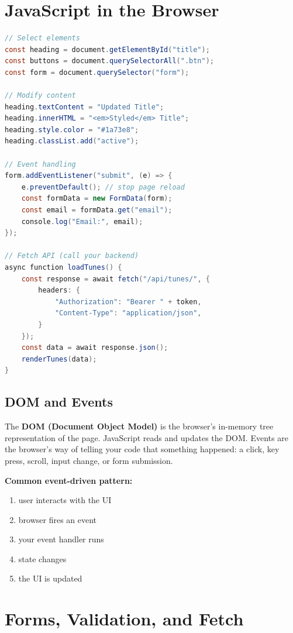 \documentclass[12pt, a4paper, oneside]{book}
\begin{document}
\section{JavaScript in the Browser}

\begin{lstlisting}[language=Java, caption={DOM manipulation and events}]
// Select elements
const heading = document.getElementById("title");
const buttons = document.querySelectorAll(".btn");
const form = document.querySelector("form");

// Modify content
heading.textContent = "Updated Title";
heading.innerHTML = "<em>Styled</em> Title";
heading.style.color = "#1a73e8";
heading.classList.add("active");

// Event handling
form.addEventListener("submit", (e) => {
    e.preventDefault(); // stop page reload
    const formData = new FormData(form);
    const email = formData.get("email");
    console.log("Email:", email);
});

// Fetch API (call your backend)
async function loadTunes() {
    const response = await fetch("/api/tunes/", {
        headers: {
            "Authorization": "Bearer " + token,
            "Content-Type": "application/json",
        }
    });
    const data = await response.json();
    renderTunes(data);
}
\end{lstlisting}

\subsection{DOM and Events}
The \textbf{DOM (Document Object Model)} is the browser's in-memory tree representation of the page. JavaScript reads and updates the DOM. Events are the browser's way of telling your code that something happened: a click, key press, scroll, input change, or form submission.

\textbf{Common event-driven pattern:}
\begin{enumerate}[leftmargin=2em]
    \item user interacts with the UI
    \item browser fires an event
    \item your event handler runs
    \item state changes
    \item the UI is updated
\end{enumerate}

\section{Forms, Validation, and Fetch}
\end{document}
